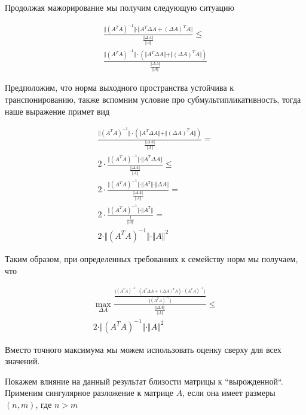 \documentclass{article}
\begin{document}
    Продолжая мажорирование мы получим следующую ситуацию

    \[
    \begin{gathered}
        \frac{ \Vert (A^{T} A)^{-1} \Vert \cdot \Vert A^{T} \Delta A + (\Delta A)^{T} A \Vert }{ \frac{\Vert \Delta A \Vert}{\Vert A \Vert} } \leq \\
        \frac{ \Vert (A^{T} A)^{-1} \Vert \cdot ( \Vert A^{T} \Delta A \Vert + \Vert (\Delta A)^{T} A \Vert) }{ \frac{\Vert \Delta A \Vert}{\Vert A \Vert} }
    \end{gathered}
    \]

    Предположим, что норма выходного пространства устойчива к транспонированию, также вспомним условие про субмультипликативность, тогда наше выражение примет вид

    \[
        \begin{gathered}
            \frac{ \Vert (A^{T} A)^{-1} \Vert \cdot ( \Vert A^{T} \Delta A \Vert + \Vert (\Delta A)^{T} A \Vert) }{ \frac{\Vert \Delta A \Vert}{\Vert A \Vert} } = \\
            2 \cdot \frac{ \Vert (A^{T} A)^{-1} \Vert \cdot \Vert A^{T} \Delta A \Vert  }{ \frac{\Vert \Delta A \Vert}{\Vert A \Vert} } \leq \\
            2 \cdot \frac{ \Vert (A^{T} A)^{-1} \Vert \cdot \Vert A^{T} \Vert \cdot \Vert \Delta A \Vert  }{ \frac{\Vert \Delta A \Vert}{\Vert A \Vert} } = \\
            2 \cdot \frac{ \Vert (A^{T} A)^{-1} \Vert \cdot \Vert A^{T} \Vert  }{ \frac{1}{\Vert A \Vert} } = \\
            2 \cdot \Vert (A^{T} A)^{-1} \Vert \cdot \Vert A \Vert^{2}
        \end{gathered}
    \]

    Таким образом, при определенных требованиях к семейству норм мы получаем, что

    \[
        \begin{gathered}
            \max_{\Delta A} \frac{ \frac{\Vert  (A^{T} A)^{-1} \cdot (A^{T} \Delta A + (\Delta A)^{T} A) \cdot (A^{T} A)^{-1} \Vert }{\Vert (A^T A)^{-1} \Vert} }{ \frac{\Vert \Delta A \Vert}{\Vert A \Vert} } \leq \\
            2 \cdot \Vert (A^{T} A)^{-1} \Vert \cdot \Vert A \Vert^{2}
        \end{gathered}
    \]

    Вместо точного максимума мы можем использовать оценку сверху для всех значений.

    Покажем влияние на данный результат близости матрицы к ``вырожденной``.
    Применим сингулярное разложение к матрице $A$, если она имеет размеры $(n, m)$, где $n > m$
\end{document}
